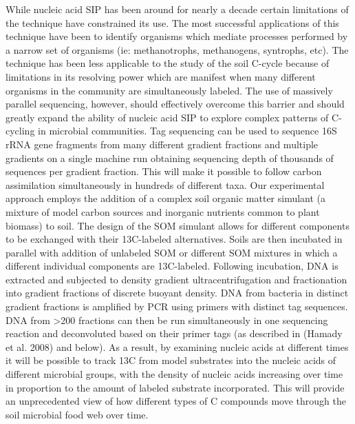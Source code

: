 {While nucleic acid SIP has been around for nearly a decade certain limitations of the technique have constrained its use. The most successful applications of this technique have been to identify organisms which mediate processes performed by a narrow set of organisms (ie: methanotrophs, methanogens, syntrophs, etc). The technique has been less applicable to the study of the soil C-cycle because of limitations in its resolving power which are manifest when many different organisms in the community are simultaneously labeled. The use of massively parallel sequencing, however, should effectively overcome this barrier and should greatly expand the ability of nucleic acid SIP to explore complex patterns of C-cycling in microbial communities. Tag sequencing can be used to sequence 16S rRNA gene fragments from many different gradient fractions and multiple gradients on a single machine run obtaining sequencing depth of thousands of sequences per gradient fraction. This will make it possible to follow carbon assimilation simultaneously in hundreds of different taxa.
Our experimental approach employs the addition of a complex soil organic matter simulant (a mixture of model carbon sources and inorganic nutrients common to plant biomass) to soil. The design of the SOM simulant allows for different components to be exchanged with their 13C-labeled alternatives. Soils are then incubated in parallel with addition of unlabeled SOM or different SOM mixtures in which a different individual components are 13C-labeled. Following incubation, DNA is extracted and subjected to density gradient ultracentrifugation and fractionation into gradient fractions of discrete buoyant density. DNA from bacteria in distinct gradient fractions is amplified by PCR using primers with distinct tag sequences. DNA from >200 fractions can then be run simultaneously in one sequencing reaction and deconvoluted based on their primer tags (as described in (Hamady et al. 2008) and below). As a result, by examining nucleic acids at different times it will be possible to track 13C from model substrates into the nucleic acids of different microbial groups, with the density of nucleic acids increasing over time in proportion to the amount of labeled substrate incorporated. This will provide an unprecedented view of how different types of C compounds move through the soil microbial food web over time.

}

